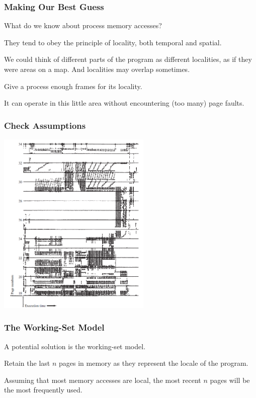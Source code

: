 \begin{frame}
\frametitle{Making Our Best Guess}

What do we know about process memory accesses? 

They tend to obey the principle of locality, both temporal and spatial.

We could think of different parts of the program as different localities, as if they were areas on a map. And localities may overlap sometimes. 

Give a process enough frames for its locality. 

It can operate in this little area without encountering (too many) page faults.


\end{frame}

\begin{frame}
\frametitle{Check Assumptions}

\begin{center}
\includegraphics[width=0.55\textwidth]{images/locality.png}
\end{center}


\end{frame}

\begin{frame}
\frametitle{The Working-Set Model}

A potential solution is the working-set model. 

Retain the last $n$ pages in memory as they represent the locale of the program. 

Assuming that most memory accesses are local, the most recent $n$ pages will be the most frequently used.


\end{frame}

